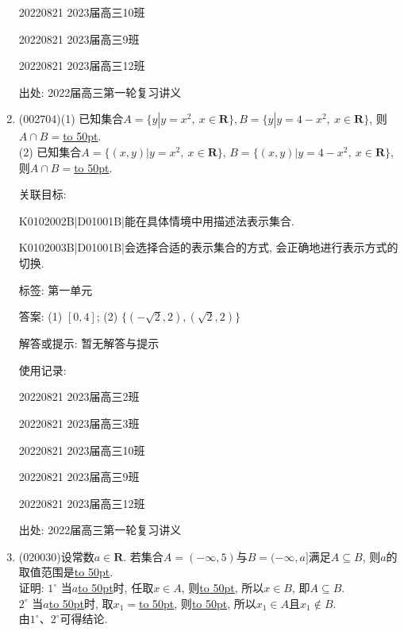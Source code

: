 \documentclass[10pt,a4paper]{article}
\newcommand{\blank}[1]{\underline{\hbox to #1pt{}}}
\begin{document}
\begin{enumerate}[1.]
20220821	2023届高三10班	

20220821	2023届高三9班	

20220821	2023届高三12班	


出处: 2022届高三第一轮复习讲义
\newpage
\item{ (002704)}(1) 已知集合$A=\{y|y=x^2, \ x\in \mathbf{R}\}, B=\{y|y=4-x^2, \ x\in \mathbf{R}\}$, 则$A\cap B=$\blank{50}.\\
(2) 已知集合$A=\{(x,y)|y={x^2},\ x\in \mathbf{R}\}$, $B=\{(x,y)|y=4-x^2, \ x\in \mathbf{R}\}$, 则$A\cap B=$\blank{50}.


关联目标:

K0102002B|D01001B|能在具体情境中用描述法表示集合.

K0102003B|D01001B|会选择合适的表示集合的方式, 会正确地进行表示方式的切换.



标签: 第一单元

答案: (1) $[0,4]$; (2) $\{(-\sqrt{2},2),(\sqrt{2},2)\}$

解答或提示: 暂无解答与提示

使用记录:

20220821	2023届高三2班		

20220821	2023届高三3班		

20220821	2023届高三10班		

20220821	2023届高三9班		

20220821	2023届高三12班	


出处: 2022届高三第一轮复习讲义
\newpage
\item{ (020030)}设常数$a\in \mathbf{R}$. 若集合$A=(-\infty ,5)$与$B=(-\infty ,a]$满足$A\subseteq B$, 则$a$的取值范围是\blank{50}.\\
证明: $1^\circ$ 当$a$\blank{50}时, 任取$x\in A$, 则\blank{50}, 所以$x\in B$, 即$A\subseteq B$.\\ 
$2^\circ$ 当$a$\blank{50}时, 取$x_1=$\blank{50}, 则\blank{50}, 所以$x_1\in A$且$x_1\not \in B$.\\
由$1^\circ$、$2^\circ$可得结论.



\end{enumerate}
\end{document}
